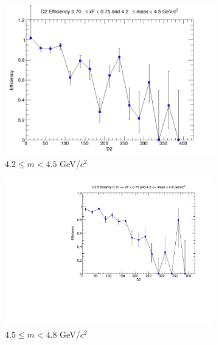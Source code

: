 \documentclass[11pt]{article}
\begin{document}
\begin{figure}[p]
    \centering
    \begin{subfigure}[b]{0.32\textwidth}
        \centering
        \includegraphics[width=\textwidth]{./kTrackerEfficiencyPlots/D2_Efficiency_xF14_mass0.png}
        \caption{$4.2 \leq m < 4.5$ GeV/$c^2$}
    \end{subfigure}\hfill
    \begin{subfigure}[b]{0.32\textwidth}
        \centering
        \includegraphics[width=\textwidth]{./kTrackerEfficiencyPlots/D2_Efficiency_xF14_mass1.pdf}
        \caption{$4.5 \leq m < 4.8$ GeV/$c^2$}
    \end{subfigure}\hfill
    \begin{subfigure}[b]{0.32\textwidth}
        \centering

\end{subfigure}
\end{figure}
\end{document}
